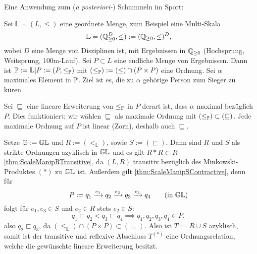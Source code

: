 Eine Anwendung zum (\emph{a posteriori-}) Schummeln im Sport:
\begin{beispiel}
    \newcommand{\Lm}{\mathbb{L}}
    Sei $\Lm = (L, \leq)$ eine geordnete Menge, zum Beispiel eine Multi-Skala
    \[
        \Lm = (\Q_{\geq 0}^D, \leq) := (\Q_{\geq 0}, \leq)^D,
    \]
    wobei $D$ eine Menge von Disziplinen ist, mit Ergebnissen in $\Q_{\geq 0}$ (Hochsprung, Weitsprung, 100m-Lauf).
    Sei $P\subset L$ eine endliche Menge von Ergebnissen.
    Dann ist $\P := \Lm|P := (P, \leq_\P)$ mit $(\leq_\P) := (\leq) \cap (P\times P)$ eine Ordnung.
    Sei $\alpha$ maximales Element in $\P$.
    Ziel ist es, die zu $\alpha$ gehörige Person zum Sieger zu küren.

    Sei $\sqsubseteq$ eine lineare Erweiterung von $\leq_\P$ in $P$ derart ist, dass $\alpha$ maximal bezüglich $P$.
    Dies funktioniert; wir wählen $\sqsubseteq$ als maximale Ordnung mit $(\leq_\P)\subset (\sqsubseteq)$.
    Jede maximale Ordnung auf $P$ ist linear (Zorn), deshalb auch $\sqsubseteq$.

    Setze $\G := \G\Lm$ und $R := (<_\Lm)$, sowie $S := (\sqsubset)$.
    Dann sind $R$ und $S$ als strikte Ordnungen azyklisch in $\G\Lm$
    und es gilt $R*R\subset R$ \eqref{thm:ScaleManipRTransitive}, da $(L, R)$ transitiv bezüglich des Minkowski-Produktes $(*)$ zu $\G\Lm$ ist.
    Außerdem gilt \eqref{thm:ScaleManipSContractive}, denn für
    \[
        P :=
            q_1 \xrightarrow{e_1}
            q_2 \xrightarrow{e_2}
            q_3 \xrightarrow{e_3}
            q_4
            \qquad\text{(in $\G\Lm$)}
    \]
    folgt für $e_1, e_3\in S$ und $e_2\in R$ stets $e_2\in S$:
    \[
        q_1 \sqsubset q_2 < q_3 \sqsubset q_4
        \implies q_1, q_2, q_3, q_4\in P,
    \]
    also $q_2\sqsubset q_3$, da $(\leq_\Lm) \cap (P\times P) \subset
    (\sqsubseteq)$.
    Also ist $T := R\cup S$ azyklisch, somit ist der transitive und reflexive Abschluss $T^{(*)}$ eine Ordnungsrelation, welche die gewünschte lineare Erweiterung besitzt.
\end{beispiel}
